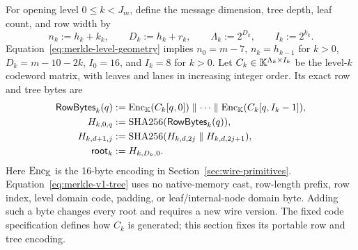 For opening level $0\le k<J_m$, define the message dimension, tree depth,
leaf count, and row width by
\begin{equation}
 n_k:=h_k+k_k,\qquad D_k:=h_k+r_k,\qquad
 \Lambda_k:=2^{D_k},\qquad I_k:=2^{k_k}.
 \label{eq:merkle-level-geometry}
\end{equation}
Equation~\eqref{eq:merkle-level-geometry} implies
$n_0=m-7$, $n_k=h_{k-1}$ for $k>0$, $D_k=m-10-2k$,
$I_0=16$, and $I_k=8$ for $k>0$.  Let
$C_k\in\mathbb K^{\Lambda_k\times I_k}$ be the level-$k$ codeword matrix, with
leaves and lanes in increasing integer order.  Its exact row and tree bytes
are
\begin{equation}
 \begin{aligned}
  \mathsf{RowBytes}_k(q)
   &:=\operatorname{Enc}_{\mathbb K}(C_k[q,0])\parallel\cdots\parallel
      \operatorname{Enc}_{\mathbb K}(C_k[q,I_k-1]),\\
  H_{k,0,q}&:=\operatorname{SHA256}(\mathsf{RowBytes}_k(q)),\\
  H_{k,d+1,j}&:=\operatorname{SHA256}
      (H_{k,d,2j}\parallel H_{k,d,2j+1}),\\
  \mathsf{root}_k&:=H_{k,D_k,0}.
 \end{aligned}
 \label{eq:merkle-v1-tree}
\end{equation}
Here $\operatorname{Enc}_{\mathbb K}$ is the 16-byte encoding in
Section~\ref{sec:wire-primitives}.  Equation~\eqref{eq:merkle-v1-tree} uses
no native-memory cast, row-length prefix, row index, level domain code, padding, or
leaf/internal-node domain byte.  Adding such a byte changes every root and
requires a new wire version.  The fixed code specification defines
how $C_k$ is generated; this section fixes its portable row and tree encoding.

